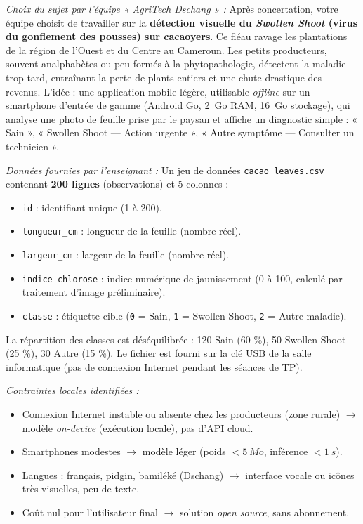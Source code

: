 \documentclass[11pt]{article}
\begin{document}
\emph{Choix du sujet par l'équipe « AgriTech Dschang » :} Après concertation, votre équipe choisit de travailler sur la \textbf{détection visuelle du \emph{Swollen Shoot} (virus du gonflement des pousses) sur cacaoyers}. Ce fléau ravage les plantations de la région de l'Ouest et du Centre au Cameroun. Les petits producteurs, souvent analphabètes ou peu formés à la phytopathologie, détectent la maladie trop tard, entraînant la perte de plants entiers et une chute drastique des revenus. L'idée : une application mobile légère, utilisable \emph{offline} sur un smartphone d'entrée de gamme (Android Go, \SI{2}{Go} RAM, \SI{16}{Go} stockage), qui analyse une photo de feuille prise par le paysan et affiche un diagnostic simple : « Sain », « Swollen Shoot — Action urgente », « Autre symptôme — Consulter un technicien ».

\emph{Données fournies par l'enseignant :} Un jeu de données \texttt{cacao\_leaves.csv} contenant \textbf{200 lignes} (observations) et 5 colonnes :
\begin{itemize}
    \item \texttt{id} : identifiant unique (1 à 200).
    \item \texttt{longueur\_cm} : longueur de la feuille (nombre réel).
    \item \texttt{largeur\_cm} : largeur de la feuille (nombre réel).
    \item \texttt{indice\_chlorose} : indice numérique de jaunissement (0 à 100, calculé par traitement d'image préliminaire).
    \item \texttt{classe} : étiquette cible (\texttt{0} = Sain, \texttt{1} = Swollen Shoot, \texttt{2} = Autre maladie).
\end{itemize}
La répartition des classes est déséquilibrée : 120 Sain (60 \%), 50 Swollen Shoot (25 \%), 30 Autre (15 \%). Le fichier est fourni sur la clé USB de la salle informatique (pas de connexion Internet pendant les séances de TP).

\emph{Contraintes locales identifiées :}
\begin{itemize}
    \item Connexion Internet instable ou absente chez les producteurs (zone rurale) $\rightarrow$ modèle \emph{on-device} (exécution locale), pas d'API cloud.
    \item Smartphones modestes $\rightarrow$ modèle léger (poids $< \SI{5}{Mo}$, inférence $< \SI{1}{s}$).
    \item Langues : français, pidgin, bamiléké (Dschang) $\rightarrow$ interface vocale ou icônes très visuelles, peu de texte.
    \item Coût nul pour l'utilisateur final $\rightarrow$ solution \emph{open source}, sans abonnement.
\end{itemize}
\end{document}
